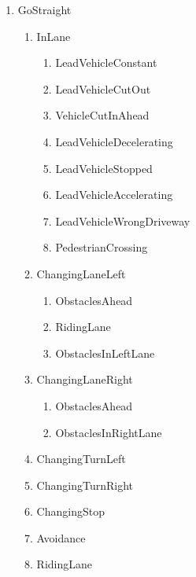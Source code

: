 \documentclass[lettersize,journal]{IEEEtran}
\begin{document}
\begin{enumerate}
    \item GoStraight
    \begin{enumerate}
        \item InLane
        \begin{enumerate}
            \item LeadVehicleConstant
            \item LeadVehicleCutOut
            \item VehicleCutInAhead
            \item LeadVehicleDecelerating
            \item LeadVehicleStopped
            \item LeadVehicleAccelerating
            \item LeadVehicleWrongDriveway
            \item PedestrianCrossing
        \end{enumerate}
        \item ChangingLaneLeft
        \begin{enumerate}
            \item ObstaclesAhead
            \item RidingLane
            \item ObstaclesInLeftLane
        \end{enumerate}
        \item ChangingLaneRight
        \begin{enumerate}
            \item ObstaclesAhead
            \item ObstaclesInRightLane
        \end{enumerate}
        \item ChangingTurnLeft
        \item ChangingTurnRight
        \item ChangingStop
        \item Avoidance
        \item RidingLane
    \end{enumerate}
    

\end{enumerate}
\end{document}
